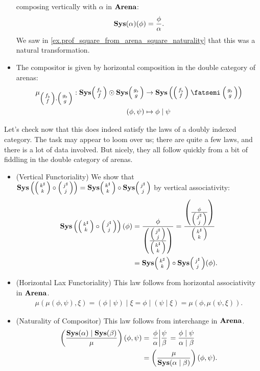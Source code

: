 \documentclass[DynamicalBook]{subfiles}
\begin{document}
\begin{definition}
\begin{itemize}
  composing vertically with $\alpha$ in $\textbf{Arena}$:
$$\textbf{Sys}(\alpha)(\phi) = \frac{\phi}{\alpha}.$$
We saw in \cref{ex.prof_square_from_arena_square_naturality} that this was a
natural transformation.
\item The compositor is given by horizontal composition in the double category
  of arenas:
  \begin{align*}
    \mu_{\littlelens{f_{\flat}}{f},\littlelens{g_{\flat}}{g}} : \Cat{Sys}\littlelens{f_{\flat}}{f} \odot \Cat{Sys}\littlelens{g_{\flat}}{g} &\to \Cat{Sys}\left( \littlelens{f_{\flat}}{f} \then \littlelens{g_{\flat}}{g} \right) \\
(\phi, \psi) &\mapsto \phi \mid \psi
  \end{align*}
\end{itemize}
\end{definition}

Let's check now that this does indeed satisfy the laws of a doubly indexed
category. The task may appear to loom over us; there are quite a few laws, and
there is a lot of data involved. But nicely, they all follow quickly from a bit of fiddling in the double
category of arenas.
\begin{itemize}
  \item (Vertical Functoriality) We show that $\Cat{Sys}\left(
      \lens{k^{\sharp}}{k} \circ \lens{j^{\sharp}}{j} \right) =
    \Cat{Sys}\lens{k^{\sharp}}{k} \circ \Cat{Sys}\lens{j^{\sharp}}{j}$ by
    vertical associativity:
\begin{align*}
  \Cat{Sys}\left(\lens{k^{\sharp}}{k} \circ \lens{j^{\sharp}}{j} \right)(\phi) &= \frac{\phi}{\left( \frac{\littlelens{j^{\sharp}}{j}}{\littlelens{k^{\sharp}}{k}} \right)} 
= \frac{\left( \frac{\phi}{\littlelens{j^{\sharp}}{j}} \right)}{\littlelens{k^{\sharp}}{k}} \\
&= \Cat{Sys}\lens{k^{\sharp}}{k} \circ \Cat{Sys}\lens{j^{\sharp}}{j}(\phi).
\end{align*}

\item (Horizontal Lax Functoriality) This law follows from horizontal
  associativity in $\textbf{Arena}$.
\begin{align}
  \mu(\mu(\phi, \psi), \xi) = (\phi \mid \psi ) \mid \xi = \phi \mid (\psi \mid \xi) = \mu(\phi, \mu(\psi, \xi)).
\end{align}
\item (Naturality of Compositor) This law follows from interchange in
  $\textbf{Arena}$.
\begin{align*}
  \left( \frac{\textbf{Sys}(\alpha) \mid \textbf{Sys}(\beta)}{\mu} \right)(\phi, \psi) &= \left. \frac{\phi}{\alpha} \middle| \frac{\psi}{\beta} \right. 
= \frac{\phi \mid \psi}{\alpha \mid \beta} \\
&= \left(  \frac{\mu}{\textbf{Sys}(\alpha \mid \beta)}\right)(\phi, \psi).
\end{align*}
\end{itemize}
\end{document}
